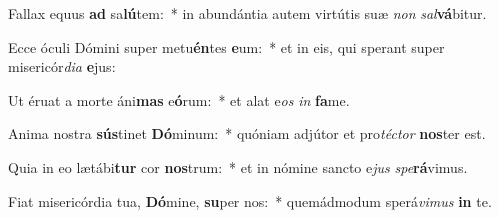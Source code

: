 \item Fallax equus \textbf{ad} sa\textbf{lú}tem:~* in abundántia autem virtútis suæ \textit{non} \textit{sal}\textbf{vá}bitur.
\item Ecce óculi Dómini super metu\textbf{én}tes \textbf{e}um:~* et in eis, qui sperant super misericór\textit{di}\textit{a} \textbf{e}jus:
\item Ut éruat a morte áni\textbf{mas} e\textbf{ó}rum:~* et alat e\textit{os} \textit{in} \textbf{fa}me.
\item Anima nostra \textbf{sús}tinet \textbf{Dó}minum:~* quóniam adjútor et pro\textit{téc}\textit{tor} \textbf{nos}ter est.
\item Quia in eo lætábi\textbf{tur} cor \textbf{nos}trum:~* et in nómine sancto e\textit{jus} \textit{spe}\textbf{rá}vimus.
\item Fiat misericórdia tua, \textbf{Dó}mine, \textbf{su}per nos:~* quemádmodum sperá\textit{vi}\textit{mus} \textbf{in} te.
